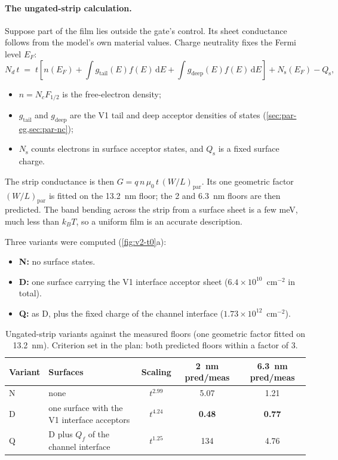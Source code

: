 \paragraph{The ungated-strip calculation.} Suppose part of the film lies outside the gate's control. Its sheet
conductance follows from the model's own material values. Charge neutrality fixes the Fermi level $E_F$:
\begin{equation}
N_d\,t \;=\; t\left[n(E_F) + \int g_{\mathrm{tail}}(E) f(E)\,\mathrm{d}E + \int g_{\mathrm{deep}}(E) f(E)\,\mathrm{d}E\right]
 + N_{\mathrm{s}}(E_F) - Q_{\mathrm{s}},
\label{eq:v2-neutral}
\end{equation}
\begin{itemize}
\item $n = N_c F_{1/2}$ is the free-electron density;
\item $g_{\mathrm{tail}}$ and $g_{\mathrm{deep}}$ are the V1 tail and deep acceptor densities of states (\cref{sec:par-eg,sec:par-nc});
\item $N_{\mathrm{s}}$ counts electrons in surface acceptor states, and $Q_{\mathrm{s}}$ is a fixed surface charge.
\end{itemize}
The strip conductance is then $G = q\,n\,\mu_0\,t\,(W/L)_{\mathrm{par}}$. Its one geometric factor $(W/L)_{\mathrm{par}}$
is fitted on the 13.2~nm floor; the 2 and 6.3~nm floors are then predicted. The band bending across the strip from a
surface sheet is a few meV, much less than $k_BT$, so a uniform film is an accurate description.

Three variants were computed (\cref{fig:v2-t0}a):
\begin{itemize}
\item \textbf{N:} no surface states.
\item \textbf{D:} one surface carrying the V1 interface acceptor sheet ($6.4\times10^{10}$~cm$^{-2}$ in total).
\item \textbf{Q:} as D, plus the fixed charge of the channel interface ($1.73\times10^{12}$~cm$^{-2}$).
\end{itemize}

\begin{table}[htbp]\centering\small
\caption{Ungated-strip variants against the measured floors (one geometric factor fitted on 13.2~nm). Criterion set in
the plan: both predicted floors within a factor of 3.}\label{tab:v2-strip}
\begin{tabular}{llccc}\toprule
Variant & Surfaces & Scaling & 2~nm pred/meas & 6.3~nm pred/meas\\\midrule
N & none & $t^{2.99}$ & 5.07 & 1.21\\
D & one surface with the V1 interface acceptors & $t^{4.24}$ & \textbf{0.48} & \textbf{0.77}\\
Q & D plus $Q_f$ of the channel interface & $t^{1.25}$ & 134 & 4.76\\\bottomrule
\end{tabular}
\end{table}

